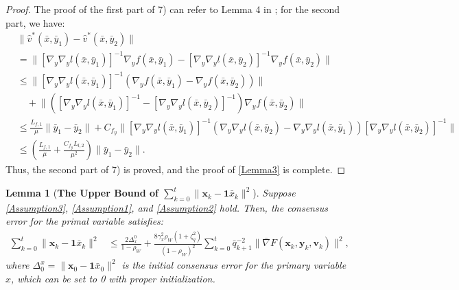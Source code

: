 \documentclass{article}
\theoremstyle{plain}
\newtheorem{lemma}[lemma]{Lemma}
\theoremstyle{definition}
\theoremstyle{remark}
\begin{document}
\begin{proof}
The proof of the first part of 7) can refer to Lemma 4 in \citep{yang2024simfbo}; for the second part, we have:
\begin{align}
   & \big\|\hat{v}^*(\bar{x}, \bar{y}_1) - \hat{v}^*(\bar{x}, \bar{y}_2)\big\|\nonumber\\
   &= \big\|\left[\nabla_{{y}}\nabla_{{y}}l(\bar{x}, \bar{y}_1)\right]^{-1}\nabla_{{y}}f(\bar{x}, \bar{y}_1) - \left[\nabla_{{y}}\nabla_{{y}}l(\bar{x}, \bar{y}_2)\right]^{-1}\nabla_{{y}}f(\bar{x}, \bar{y}_2)\big\|\nonumber\\
    &\leq \big\|\left[\nabla_{{y}}\nabla_{{y}}l(\bar{x}, \bar{y}_1)\right]^{-1}\left(\nabla_{{y}}f(\bar{x}, \bar{y}_1) - \nabla_{{y}}f(\bar{x}, \bar{y}_2)\right)\big\|\nonumber \\
    &\quad + \big\|([\nabla_{{y}}\nabla_{{y}}l(\bar{x}, \bar{y}_1)]^{-1} - \left[\nabla_{{y}}\nabla_{{y}}l(\bar{x}, \bar{y}_2)\right]^{-1})\nabla_{{y}}f(\bar{x}, \bar{y}_2)\big\| \nonumber\\
    &\leq \frac{L_{f,1}}{\mu} \big\|\bar{y}_1 - \bar{y}_2\big\| + C_{f_y}\big\|\left[\nabla_{{y}}\nabla_{{y}}l(\bar{x}, \bar{y}_1)\right]^{-1}\left(\nabla_{{y}}\nabla_{{y}}l(\bar{x}, \bar{y}_2) - \nabla_{{y}}\nabla_{{y}}l(\bar{x}, \bar{y}_1)\right)\left[\nabla_{{y}}\nabla_{{y}}l(\bar{x}, \bar{y}_2)\right]^{-1}\!\!\big\| \nonumber\\
    &\leq \left(\frac{L_{f,1}}{\mu} + \frac{C_{f_y} L_{l,2}}{\mu^2}\right)\big\|\bar{y}_1 - \bar{y}_2\big\|.\label{eq30}
\end{align}
Thus, the second part of 7) is proved, and the proof of \cref{Lemma3} is complete.
\end{proof}

\begin{lemma}[\textbf{The Upper Bound of $\sum_{k=0}^{t}\|\mathbf{x}_k-\mathbf{1}\bar{x}_k\|^2$}]\label{Lemmanewx} Suppose \cref{Assumption3}, \cref{Assumption1}, and \cref{Assumption2} hold. Then, the consensus error for the primal variable satisfies:
\begin{align}
 \sum_{k=0}^{t} \|\mathbf{x}_k-\mathbf{1}\bar{x}_k\|^2 
&\leq \frac{2\Delta_x^0}{1 - \rho_W}  
+ \frac{8 \gamma_x^2 \rho_W (1 + \zeta_q^2)}{(1 - \rho_W)^2} \sum_{k=0}^{t} 
 \bar{q}_{k+1}^{-2} \|\bar{\nabla}F(\mathbf{x}_k, \mathbf{y}_k, \mathbf{v}_k)\|^2, \label{eqnewx39}
\end{align}
where \(\Delta_0^x=\|\mathbf{x}_0-\mathbf{1}\bar{x}_0\|^2\) is the initial consensus error for the primary variable $x$, which can be set to 0 with proper initialization.
\end{lemma}
\end{document}
